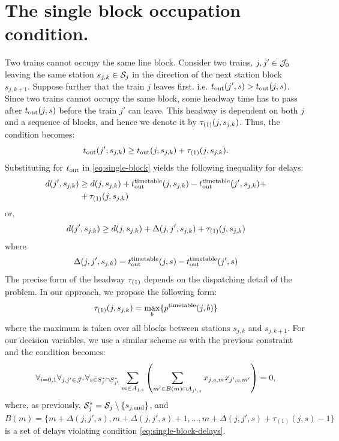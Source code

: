 \section{The single block occupation condition.}
Two trains cannot occupy the same line block. Consider two
trains, $j, j' \in \mathcal{J}_0$ leaving the same station $s_{j,k} \in \mathcal{S}_j$ in the direction of the
next station block $s_{j,k+1}$. Suppose further that the train $j$ leaves
first. i.e. $t_\text{out}(j', s) > t_\text{out}(j, s)$. Since two trains cannot occupy the
same block, some headway time has to pass after $t_\text{out}(j, s)$ before the
train $j'$ can leave. This headway is dependent on both $j$ and a
sequence of blocks, and hence we denote it by $\tau_{(1)}(j, s_{j,k})$. Thus,
the condition becomes:
\begin{equation}
  \label{eq:single-block}
  t_\text{out}(j', s_{j,k}) \ge t_\text{out}(j, s_{j,k}) + \tau_{(1)}(j, s_{j,k}).
\end{equation}
Substituting for $t_\text{out}$ in \eqref{eq:single-block} yields the following
inequality for delays:
\begin{equation}
\begin{split}
  \label{eq:single-block-delays}
  d(j', s_{j,k}) &\ge d(j, s_{j,k}) + t_\text{out}^\text{timetable}(j, s_{j,k}) - t_\text{out}^\text{timetable}(j', s_{j,k}) + \\
  &+\tau_{(1)}(j, s_{j,k})
\end{split}
\end{equation}
or,
\begin{equation}
  d(j', s_{j,k}) \ge d(j, s_{j,k}) + \Delta(j, j',s_{j,k}) + \tau_{(1)}(j, s_{j,k})
\end{equation}
where
\begin{equation}
  \label{eq:delta}
  \Delta(j, j', s_{j,k}) = t_\text{out}^\text{timetable}(j, s) - t_\text{out}^\text{timetable}(j', s)
\end{equation}
The precise form of the headway $\tau_{(1)}$ depends on the dispatching detail of the problem.
In our approach, we propose the following form:
\begin{equation}
  \tau_{(1)}(j, s_{j,k}) = \max_{b}\{p^\text{timetable}(j,b)\}
\end{equation}
where the maximum is taken over all blocks between stations $s_{j,k}$ and $s_{j,k+1}$.
For our decision variables, we use a similar scheme as with the previous
constraint and the condition becomes:
\begin{equation}
  \label{eq:qubo:singleblock}
  \forall_{i=0,1} \forall_{j, j' \in \mathcal{J}^{i}} \forall_{s \in S^{*}_{j} \cap S^{*}_{j'}} \sum_{m \in A_{j, s}} \left(
  \sum_{m' \in B(m) \cap A_{j', s}} x_{j,s,m}x_{j',s,m'}
  \right) = 0,
\end{equation}
where, as previously, $\mathcal{S}_{j}^{*} = \mathcal{S}_j \setminus \{s_{j,\operatorname*{end}}\}$, and $B(m) = \{m + \Delta(j, j', s), m + \Delta(j, j', s)+ 1,\ldots, m +
  \Delta(j, j', s) + \tau_{(1)}(j,s)-1 \}$
is a set of delays violating condition \eqref{eq:single-block-delays}.


